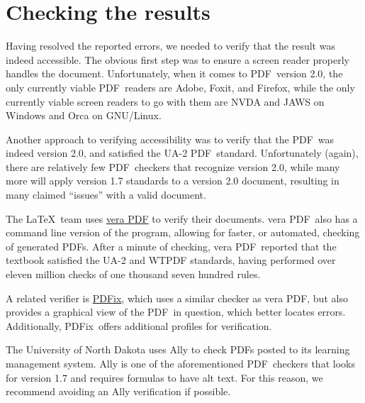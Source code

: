 \documentclass{article}
\makeatletter
\newcommand{\SMC}{%
 \ifdefined\@currsize  %
  \ifx\@currsize\normalsize\small\else
   \ifx\@currsize\small\footnotesize\else
    \ifx\@currsize\footnotesize\scriptsize\else
     \ifx\@currsize\large\normalsize\else
      \ifx\@currsize\Large\large\else
       \ifx\@currsize\LARGE\Large\else
        \ifx\@currsize\scriptsize\tiny\else
         \ifx\@currsize\tiny\tiny\else
          \ifx\@currsize\huge\LARGE\else
           \ifx\@currsize\Huge\huge\else
            \small\SMC@unknown@warning
 \fi\fi\fi\fi\fi\fi\fi\fi\fi\fi\fi
}
\newcommand*{\acro}[1]{{\SMC #1}\@}
\newcommand{\PDF}{\acro{PDF}}
\newcommand{\veraPDF}{vera\PDF}
\newcommand{\VeraPDF}{vera\PDF}  %
\newcommand{\PDFix}{\PDF ix}
\makeatother
\begin{document}
\section{Checking the results}

Having resolved the reported errors,
we needed to verify that the result was indeed accessible.
The obvious first step was to ensure
a screen reader properly handles the document.
Unfortunately, when it comes to \PDF\ version 2.0,
the only currently viable \PDF\ readers are Adobe, Foxit, and Firefox,
while the only currently viable screen readers to go with them are
\acro{NVDA} and \acro{JAWS} on Windows and Orca on \acro{GNU}/Linux.

Another approach to verifying accessibility was to verify that
the \PDF\ was indeed version 2.0,
and satisfied the \acro{UA-2} \PDF\ standard.
Unfortunately (again),
there are relatively few \PDF\ checkers that recognize version 2.0,
while many more will apply version 1.7 standards to a version 2.0 document,
resulting in many claimed ``issues'' with a valid document.

The \LaTeX\ team uses \href{https://verapdf.org/}{\veraPDF} to verify their
documents.
\VeraPDF\ also has a command line version of the program,
allowing for faster, or automated, checking of generated \PDF s.
After a minute of checking, \veraPDF\ reported that the textbook
satisfied the \acro{UA-2} and \acro{WTPDF} standards,
having performed over eleven million checks
of one thousand seven hundred rules.

A related verifier is \href{https://pdfix.net/}{\PDFix}, which uses a similar
checker as \veraPDF,
but also provides a graphical view of the \PDF\ in question,
which better locates errors.
Additionally, \PDFix\ offers additional profiles for verification.

The University of North Dakota uses Ally
to check \PDF s posted to its learning management system.
Ally is one of the aforementioned \PDF\ checkers that looks for version 1.7
and requires formulas to have alt text.
For this reason,
we recommend avoiding an Ally verification if possible.

\end{document}
